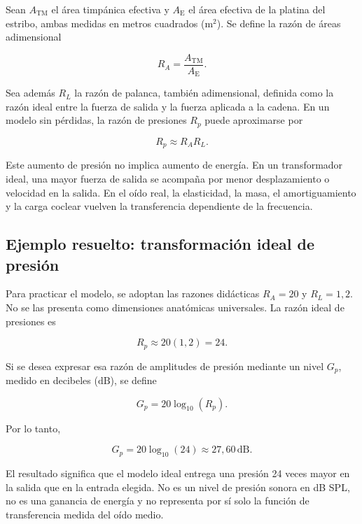 Sean \(A_\mathrm{TM}\) el área timpánica efectiva y \(A_\mathrm{E}\) el área
efectiva de la platina del estribo, ambas medidas en metros cuadrados
(\(\text{m}^2\)). Se define la razón de áreas adimensional

\begin{equation}
    R_A=\frac{A_\mathrm{TM}}{A_\mathrm{E}}.
    \label{eq:u6-razon-areas}
\end{equation}

Sea además \(R_L\) la razón de palanca, también adimensional, definida como la
razón ideal entre la fuerza de salida y la fuerza aplicada a la cadena. En un
modelo sin pérdidas, la razón de presiones \(R_p\) puede aproximarse por

\begin{equation}
    R_p\approx R_A R_L.
    \label{eq:u6-razon-presiones}
\end{equation}

Este aumento de presión no implica aumento de energía. En un transformador
ideal, una mayor fuerza de salida se acompaña por menor desplazamiento o
velocidad en la salida. En el oído real, la elasticidad, la masa, el
amortiguamiento y la carga coclear vuelven la transferencia dependiente de la
frecuencia.

\subsection{Ejemplo resuelto: transformación ideal de presión}
\label{sec:u6-ejemplo-oido-medio}

Para practicar el modelo, se adoptan las razones didácticas \(R_A=20\) y
\(R_L=1{,}2\). No se las presenta como dimensiones anatómicas universales.
La razón ideal de presiones es

\[
    R_p\approx20(1{,}2)=24.
\]

Si se desea expresar esa razón de amplitudes de presión mediante un nivel
\(G_p\), medido en decibeles (\(\text{dB}\)), se define

\begin{equation}
    G_p=20\log_{10}(R_p).
    \label{eq:u6-nivel-transformacion-presion}
\end{equation}

Por lo tanto,

\[
    G_p=20\log_{10}(24)\approx27{,}60\,\text{dB}.
\]

El resultado significa que el modelo ideal entrega una presión 24 veces mayor
en la salida que en la entrada elegida. No es un nivel de presión sonora en
dB SPL, no es una ganancia de energía y no representa por sí solo la función
de transferencia medida del oído medio.

